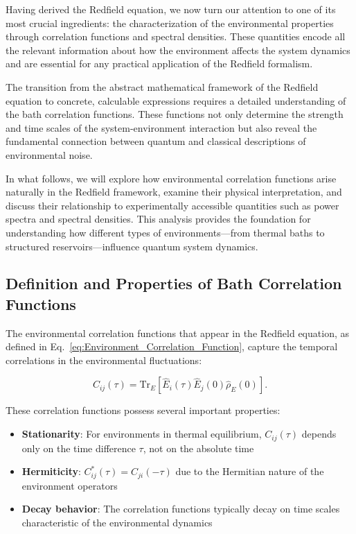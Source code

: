 Having derived the Redfield equation, we now turn our attention to one of its most crucial ingredients: the characterization of the environmental properties through correlation functions and spectral densities. These quantities encode all the relevant information about how the environment affects the system dynamics and are essential for any practical application of the Redfield formalism.

The transition from the abstract mathematical framework of the Redfield equation to concrete, calculable expressions requires a detailed understanding of the bath correlation functions. These functions not only determine the strength and time scales of the system-environment interaction but also reveal the fundamental connection between quantum and classical descriptions of environmental noise.

In what follows, we will explore how environmental correlation functions arise naturally in the Redfield framework, examine their physical interpretation, and discuss their relationship to experimentally accessible quantities such as power spectra and spectral densities. This analysis provides the foundation for understanding how different types of environments—from thermal baths to structured reservoirs—influence quantum system dynamics.

\subsection{Definition and Properties of Bath Correlation Functions}

The environmental correlation functions that appear in the Redfield equation, as defined in Eq.~\eqref{eq:Environment_Correlation_Function}, capture the temporal correlations in the environmental fluctuations:

\begin{equation}
	C_{ij}(\tau) = \mathrm{Tr}_E[\hat{E}_i(\tau) \hat{E}_j(0) \hat{\rho}_E(0)].
	\label{eq:bath_correlator_detailed}
\end{equation}

These correlation functions possess several important properties:

\begin{itemize}
	\item \textbf{Stationarity}: For environments in thermal equilibrium, $C_{ij}(\tau)$ depends only on the time difference $\tau$, not on the absolute time
	\item \textbf{Hermiticity}: $C_{ij}^*(\tau) = C_{ji}(-\tau)$ due to the Hermitian nature of the environment operators
	\item \textbf{Decay behavior}: The correlation functions typically decay on time scales characteristic of the environmental dynamics
\end{itemize}

